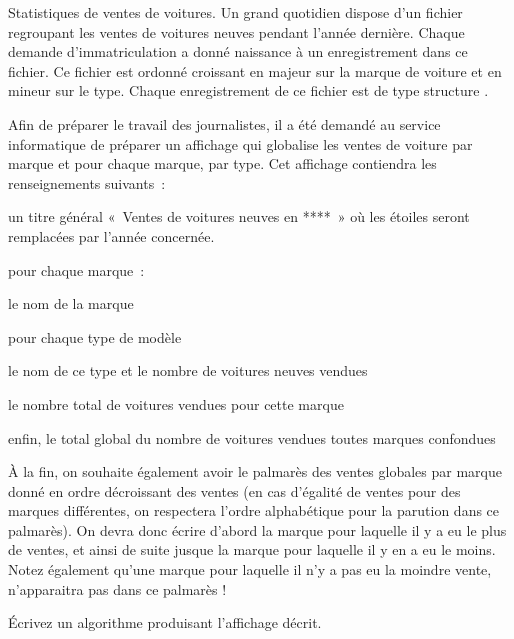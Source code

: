 \begin{Exercice}{Statistiques de ventes de voitures.}
	Un grand quotidien dispose d’un fichier  regroupant les ventes de
	voitures neuves pendant l’année dernière. Chaque demande
	d’immatriculation a donné naissance à un enregistrement dans ce
	fichier. Ce fichier est ordonné croissant en majeur sur la marque de
	voiture et en mineur sur le type. Chaque enregistrement de ce fichier
	est de type structure .


	Afin de préparer le travail des journalistes, il a été demandé au
	service informatique de préparer un affichage qui globalise les ventes
	de voiture par marque et pour chaque marque, par type. Cet affichage
	contiendra les renseignements suivants~:

	\begin{liste}
		\item 
			un titre général «~Ventes de voitures neuves en ****~» où les étoiles
			seront remplacées par l’année concernée.
		\item 
			pour chaque marque~:
			\begin{liste}
				\item 
					le nom de la marque
				\item 
					pour chaque type de modèle
				\item 
					le nom de ce type et le nombre de voitures neuves vendues
				\item 
					le nombre total de voitures vendues pour cette marque
			\end{liste}
		\item 
			enfin, le total global du nombre de voitures vendues toutes marques
			confondues
	\end{liste}
	
	À la fin, on souhaite également avoir le palmarès des ventes globales
	par marque donné en ordre décroissant des ventes (en cas d’égalité de
	ventes pour des marques différentes, on respectera l’ordre alphabétique
	pour la parution dans ce palmarès). On devra donc écrire d’abord la
	marque pour laquelle il y a eu le plus de ventes, et ainsi de suite
	jusque la marque pour laquelle il y en a eu le moins. Notez également
	qu’une marque pour laquelle il n’y a pas eu la moindre vente,
	n’apparaitra pas dans ce palmarès !

	Écrivez un algorithme produisant l'affichage décrit.
\end{Exercice}


